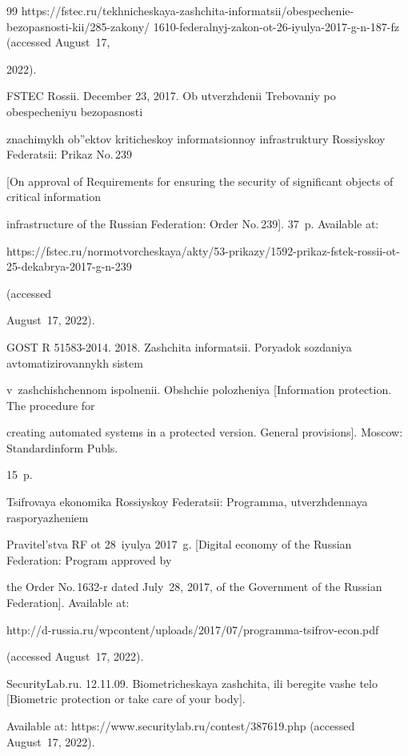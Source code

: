 {{\begin{thebibliography}{99}
{https://fstec.ru/\linebreak tekhnicheskaya-zashchita-informatsii/obespechenie-bezopasnosti-kii/285-zakony/ 1610-federalnyj-zakon-ot-26-iyulya-2017-g-n-187-fz} (accessed August~17, 


2022).




FSTEC Rossii. December 23, 2017. Ob utverzhdenii Trebovaniy po obes\-pe\-che\-niyu bezopasnosti 


znachimykh ob''ektov kriticheskoy informatsionnoy inf\-ra\-struk\-tu\-ry Rossiyskoy Federatsii: Prikaz No.\,239 


[On approval of Requirements for ensuring the security of significant objects of critical information 


infrastructure of the Russian Federation: Order No.\,239]. 37~p. Available at: {\sf 


https://fstec.ru/normotvorcheskaya/akty/53-prikazy/1592-prikaz-fstek-rossii-ot-25-dekabrya-2017-g-n-239} (accessed 


August~17, 2022).




GOST R 51583-2014. 2018. Zashchita informatsii. Poryadok sozdaniya avtomatizirovannykh sistem 


v~zashchishchennom ispolnenii. Obshchie polozheniya [Information protection. The procedure for 


creating automated systems in a protected version. General provisions]. Moscow: Standardinform Publs. 


15~p.




Tsifrovaya ekonomika Rossiyskoy Federatsii: Programma, utverzhdennaya rasporyazheniem 


Pravitel'stva RF ot 28~iyulya 2017~g. [Digital economy of the Russian Federation: Program approved by 


the Order No.\,1632-r dated July~28, 2017, of the Government of the Russian Federation]. Available at: {\sf 


http://d-russia.ru/wpcontent/\linebreak uploads/2017/07/programma-tsifrov-econ.pdf} (accessed August~17, 2022).




SecurityLab.ru. 12.11.09. Biometricheskaya zashchita, ili beregite vashe telo [Biometric protection or take care of your body]. 


Available at: {\sf  https://www.securitylab.\linebreak ru/contest/387619.php} (accessed August~17, 2022).



\end{thebibliography}}}
